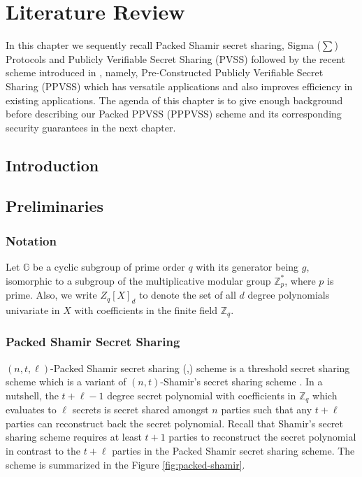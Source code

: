 \chapter{Literature Review}
\label{cha:1}
In this chapter we sequently recall Packed Shamir secret sharing, 
Sigma ($\sum$) Protocols and Publicly Verifiable Secret Sharing (PVSS) followed by
the recent scheme introduced in \cite{cryptoeprint:2025/576}, namely, 
Pre-Constructed Publicly Verifiable Secret Sharing (PPVSS) which has versatile 
applications and also improves efficiency in existing applications.
The agenda of this chapter is to give enough background before describing our Packed PPVSS (PPPVSS) scheme 
and its corresponding security guarantees in the next chapter.

\section{Introduction}

\section{Preliminaries}
\label{sec:preliminaries}
\subsection{Notation}
Let $\mathbb{G}$ be a cyclic subgroup of prime order $q$ with its generator being 
$g$, isomorphic to a subgroup of the multiplicative modular group $\mathbb{Z}_p^*$, 
where $p$ is prime. Also, we write $Z_{q}[X]_d$ to denote the set of all $d$ degree 
polynomials univariate in $X$ with coefficients in the finite field $\mathbb{Z}_q$. 

\subsection{Packed Shamir Secret Sharing}
\label{sec:packed-shamir}
$(n,t,\ell)$-Packed Shamir secret sharing (\cite{10.1145/129712.129780},\cite{crypto-1984-905})
 scheme is a threshold secret sharing scheme which is a variant of $(n,t)$-Shamir's 
 secret sharing scheme \cite{10.1145/359168.359176}. In a nutshell, the $t+\ell-1$ 
 degree secret polynomial with coefficients in $\mathbb{Z}_q$ which evaluates to $\ell$ 
 secrets is secret shared amongst $n$ parties such that any $t+\ell$ parties can 
 reconstruct back the secret polynomial. Recall that Shamir's secret sharing scheme 
 requires at least $t+1$ parties to reconstruct the secret polynomial in contrast to 
 the $t+\ell$ parties in the Packed Shamir secret sharing scheme. The scheme is
 summarized in the Figure \ref{fig:packed-shamir}.
 

